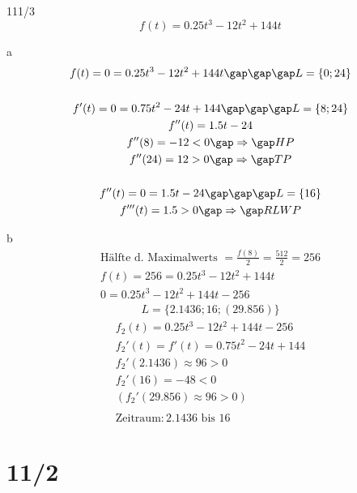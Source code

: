 \begin{exercise}{111/3}
  $$f(t) = 0.25t^3 - 12t^2 + 144t$$
  \item [a]
  \begin{gather*}
    f(t) = 0 = 0.25t^3 - 12t^2 + 144t \gap\gap\gap L = \{0; 24\} \\\\
    f'(t) = 0 = 0.75t^2 - 24t + 144 \gap\gap\gap L = \{8; 24\} \\
    f''(t) = 1.5t - 24 \\
    f''(8) = -12 < 0 \gap\Rightarrow\gap HP \\
    f''(24) = 12 > 0 \gap\Rightarrow\gap TP \\\\
    f''(t) = 0 = 1.5t - 24 \gap\gap\gap L = \{16\} \\
    f'''(t) = 1.5 > 0 \gap\Rightarrow\gap RLWP
  \end{gather*}
  \item [b]
  \begin{gather*}
    \text{Hälfte d. Maximalwerts } = \frac{f(8)}{2} = \frac{512}{2} = 256 \\
    f(t) = 256 = 0.25t^3 - 12t^2 + 144t \\
    0 = 0.25t^3 - 12t^2 + 144t - 256
  \end{gather*}
  \begin{gather*}
    L = \{2.1436; 16; (29.856)\}
  \end{gather*}
  \begin{gather*}
    f_2(t) = 0.25t^3 - 12t^2 + 144t - 256 \\
    f_2'(t) = f'(t) = 0.75t^2 - 24t + 144 \\
    f_2'(2.1436) \approx 96 > 0 \\
    f_2'(16) = -48 < 0 \\
    (f_2'(29.856) \approx 96 > 0) \\\\
    \text{Zeitraum} \colon 2.1436 \text{ bis } 16
  \end{gather*}
\end{exercise}

\part{11/2}

